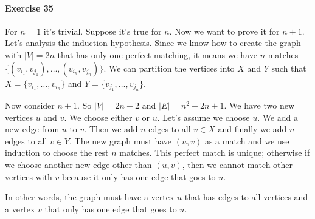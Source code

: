 \documentclass{book}
\begin{document}
	\paragraph{Exercise 35}
	For $n = 1$ it's trivial. Suppose it's true for $n$. Now we want to prove it for $n + 1$. Let's analysis the induction hypothesis. Since we know how to create the graph with $|V| = 2n$ that has only one perfect matching, it means we have $n$ matches $\{(v_{i_1}, v_{j_1}), \dots ,(v_{i_n}, v_{j_n})\}$. We can partition the vertices into $X$ and $Y$ such that $X = \{v_{i_1}, \dots, v_{i_n}\}$ and $Y = \{v_{j_1}, \dots, v_{j_n}\}$.
	\par Now consider $n + 1$. So $|V| = 2n + 2$ and $|E| = n^2 + 2n + 1$. We have two new vertices $u$ and $v$. We choose either $v$ or $u$. Let's assume we choose $u$. We add a new edge from $u$ to $v$. Then we add $n$ edges to all $v \in X$ and finally we add $n$ edges to all $v \in Y$. The new graph must have $(u, v)$ as a match and we use induction to choose the rest $n$ matches. This perfect match is unique; otherwise if we choose another new edge other than $(u, v)$, then we cannot match other vertices with $v$ because it only has one edge that goes to $u$.
	\par In other words, the graph must have a vertex $u$ that has edges to all vertices and a vertex $v$ that only has one edge that goes to $u$.
	
\end{document}
